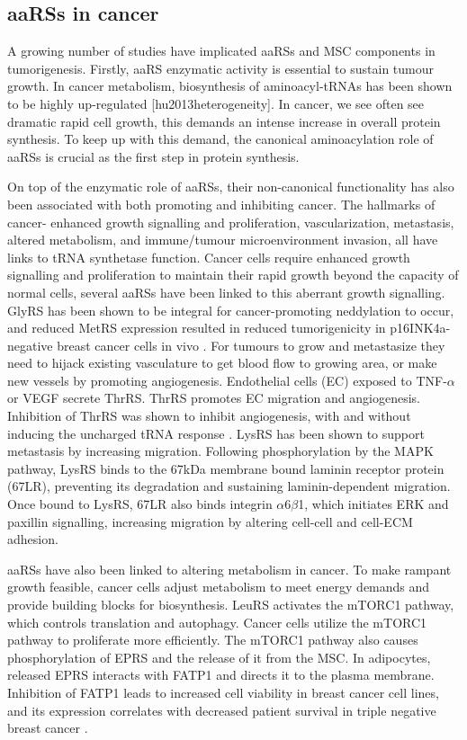 \subsection{aaRSs in cancer}
A growing number of studies have implicated aaRSs and MSC components in tumorigenesis.
Firstly, aaRS enzymatic activity is essential to sustain tumour growth. In cancer metabolism, biosynthesis of aminoacyl-tRNAs has been shown to be highly up-regulated [hu2013heterogeneity].
In cancer, we see often see dramatic rapid cell growth, this demands an intense increase in overall protein synthesis. To keep up with this demand, the canonical aminoacylation role of aaRSs is crucial as the first step in protein synthesis.

On top of the enzymatic role of aaRSs, their non-canonical functionality has also been associated with both promoting and inhibiting cancer.
The hallmarks of cancer- enhanced growth signalling and proliferation, vascularization, metastasis, altered metabolism, and immune/tumour microenvironment invasion, all have links to tRNA synthetase function.
Cancer cells require enhanced growth signalling and proliferation to maintain their rapid growth beyond the capacity of normal cells, several aaRSs have been linked to this aberrant growth signalling.
GlyRS has been shown to be integral for cancer-promoting neddylation to occur, and reduced MetRS expression resulted in reduced tumorigenicity in p16INK4a-negative breast cancer cells in vivo \cite{mo2016neddylation, deng2020role, kwon2018stabilization}.
For tumours to grow and metastasize they need to hijack existing vasculature to get blood flow to growing area, or make new vessels by promoting angiogenesis.
Endothelial cells (EC) exposed to TNF-$\alpha$ or VEGF secrete ThrRS.
ThrRS promotes EC migration and angiogenesis.
Inhibition of ThrRS was shown to inhibit angiogenesis, with and without inducing the uncharged tRNA response \cite{williams2013secreted, mirando2015aminoacyl}.
LysRS has been shown to support metastasis by increasing migration.
Following phosphorylation by the MAPK pathway, LysRS binds to the 67kDa membrane bound laminin receptor protein (67LR), preventing its degradation and sustaining laminin-dependent migration.
Once bound to LysRS, 67LR also binds integrin $\alpha$6$\beta$1, which initiates ERK and paxillin signalling, increasing migration by altering cell-cell and cell-ECM adhesion.

aaRSs have also been linked to altering metabolism in cancer.
To make rampant growth feasible, cancer cells adjust metabolism to meet energy demands and provide building blocks for biosynthesis.
LeuRS activates the mTORC1 pathway, which controls translation and autophagy.
Cancer cells utilize the mTORC1 pathway to proliferate more efficiently.
The mTORC1 pathway also causes phosphorylation of EPRS and the release of it from the MSC.
In adipocytes, released EPRS interacts with FATP1 and directs it to the plasma membrane.
Inhibition of FATP1 leads to increased cell viability in breast cancer cell lines, and its expression correlates with decreased patient survival in triple negative breast cancer \cite{mendes2019unraveling}.

